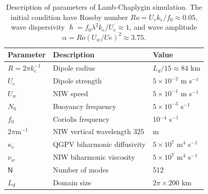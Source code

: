 \documentclass{jfm}
\begin{document}
\begin{table}
 \begin{center}
   \caption{Description of parameters of Lamb-Chaplygin simulation.
            The initial condition have Rossby number $Ro = U_e k_e/f_0 \approx
            0.05$, wave dispersivity $\hslash = f_0\lambda^2k_e/U_e
            \approx 1$, and wave amplitude $\alpha = Ro (U_w/Ue)^2 \approx 3.75$.}
   \label{parameters_lamb}
   \begin{tabular}{ l | l | l }
     \hline
      Parameter & Description & Value \\
      \hline
      $R= 2\pi k_e^{-1}$ & Dipole radius & $L_d/15 \approx 84$ km \\
      $U_e$ & Dipole strength & $5\times 10^{-2}$ m s$^{-1}$ \\
      $U_w$ & NIW speed & $5\times 10^{-1}$ m s$^{-1}$ \\
      $N_0$ & Buoyancy frequency & $5 \times 10^{-3}$ s$^{-1}$\\
      $f_0$ & Coriolis frequency & 10$^{-4}$ s$^{-1}$\\
      $2\pi$m$^{-1}$ & NIW vertical wavelength $325$ & m \\
      $\kappa_e$ & QGPV biharmonic diffusivity & $5\times 10^{7}$ m$^4$ s$^{-1}$\\
      $\nu_w$ & NIW biharmonic viscosity & $ 5 \times 10^{7}$ m$^4$ s$^{-1}$\\
      $\mathsf{N}$   & Number of modes &  512  \\
      $L_d$ & Domain size & $2\pi\times 200$ km \\
   \end{tabular}
 \end{center}
\end{table}
\end{document}

